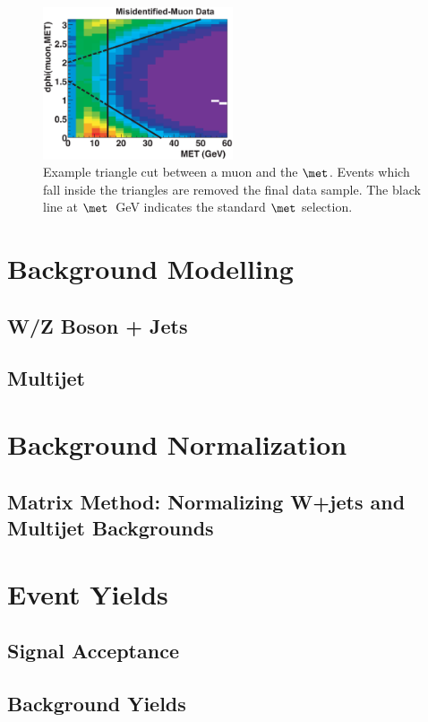 \begin{figure}[!h!tbp]
\begin{center}
\includegraphics[width=0.5\textwidth]{eps/Reco/TriangleExample.eps}
\end{center}
\vspace{-0.1in}
\caption[triangleexample]{Example triangle cut between a muon and the $\met$. Events which fall inside the triangles are removed the final data sample. The black line at $\met$~GeV indicates the standard $\met$ selection.} 
\label{triangleexample}
\end{figure}



\section{Background Modelling}
\subsection{W/Z Boson + Jets}
\subsection{\ttbar}
\subsection{Multijet}

\section{Background Normalization}
\subsection{Matrix Method: Normalizing W+jets and Multijet Backgrounds}
\subsection{\ttbar}

\section{Event Yields}
\subsection{Signal Acceptance}
\subsection{Background Yields}

